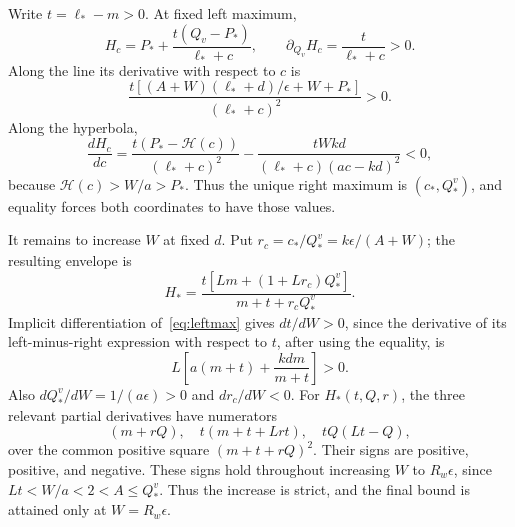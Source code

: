 Write $t=\ell_*-m>0$. At fixed left maximum,
\begin{equation}
 H_c=P_*+\frac{t(Q_v-P_*)}{\ell_*+c},\qquad
 \partial_{Q_v}H_c=\frac{t}{\ell_*+c}>0.
\end{equation}
Along the line its derivative with respect to $c$ is
\begin{equation}
 \frac{t[(A+W)(\ell_*+d)/\epsilon+W+P_*]}{(\ell_*+c)^2}>0.
\end{equation}
Along the hyperbola,
\begin{equation}
 \frac{dH_c}{dc}
 =\frac{t(P_*-\mathcal H(c))}{(\ell_*+c)^2}
 -\frac{tWkd}{(\ell_*+c)(ac-kd)^2}<0,
\end{equation}
because $\mathcal H(c)>W/a>P_*$. Thus the unique right maximum is
$(c_*,Q_*^v)$, and equality forces both coordinates to have those values.

It remains to increase $W$ at fixed $d$. Put
$r_c=c_*/Q_*^v=k\epsilon/(A+W)$; the resulting envelope is
\begin{equation}
 H_* =\frac{t[Lm+(1+Lr_c)Q_*^v]}{m+t+r_cQ_*^v}.\label{eq:envelope}
\end{equation}
Implicit differentiation of~\eqref{eq:leftmax} gives $dt/dW>0$, since
the derivative of its left-minus-right expression with respect to $t$,
after using the equality, is
\begin{equation}
 L\left[a(m+t)+\frac{kdm}{m+t}\right]>0.
\end{equation}
Also $dQ_*^v/dW=1/(a\epsilon)>0$ and $dr_c/dW<0$.
For $H_*(t,Q,r)$, the three relevant partial derivatives have numerators
\begin{equation}
 [Lm+(1+Lr)Q](m+rQ),\quad t(m+t+Lrt),\quad tQ(Lt-Q),
\end{equation}
over the common positive square $(m+t+rQ)^2$. Their signs are positive,
positive, and negative. These signs hold throughout increasing $W$ to
$R_w\epsilon$, since $Lt<W/a<2<A\le Q_*^v$. Thus the increase is
strict, and the final bound is attained only at $W=R_w\epsilon$.

